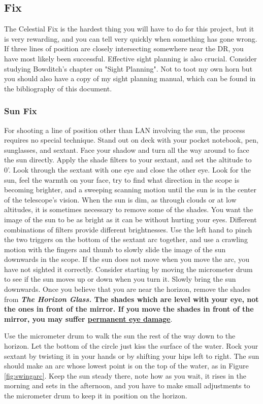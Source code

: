 \documentclass[letterpaper,12pt]{article}
\begin{document}
\subsection{Fix}
The Celestial Fix is the hardest thing you will have to do for this project, but it is very rewarding, and you can tell very quickly when something has gone wrong.
If three lines of position are closely intersecting somewhere near the DR, you have most likely been successful.
Effective sight planning is also crucial. Consider studying Bowditch's chapter on "Sight Planning".
Not to toot my own horn but you should also have a copy of my sight planning manual, which can be found in the bibliography of this document.

\subsubsection*{Sun Fix}
For shooting a line of position other than LAN involving the sun, the process requires no special technique.
Stand out on deck with your pocket notebook, pen, sunglasses, and sextant.
Face your shadow and turn all the way around to face the sun directly.
Apply the shade filters to your sextant, and set the altitude to 0'.
Look through the sextant with one eye and close the other eye.
Look for the sun, feel the warmth on your face, try to find what direction in the scope is becoming brighter, and a sweeping scanning motion until the sun is in the center of the telescope's vision.
When the sun is dim, as through clouds or at low altitudes, it is sometimes necessary to remove some of the shades.
You want the image of the sun to be as bright as it can be without hurting your eyes.
Different combinations of filters provide different brightnesses.
Use the left hand to pinch the two triggers on the bottom of the sextant arc together, and use a crawling motion with the fingers and thumb to slowly slide the image of the sun downwards in the scope.
If the sun does not move when you move the arc, you have not sighted it correctly.
Consider starting by moving the micrometer drum to see if the sun moves up or down when you turn it.
Slowly bring the sun downwards. Once you believe that you are near the horizon, remove the shades from \textbf{\emph{The Horizon Glass.}
The shades which are level with your eye, not the ones in front of the mirror.
If you move the shades in front of the mirror, you may suffer \underline{permanent eye damage}}.

Use the micrometer drum to walk the sun the rest of the way down to the horizon.
Let the bottom of the circle just kiss the surface of the water.
Rock your sextant by twisting it in your hands or by shifting your hips left to right.
The sun should make an arc whose lowest point is on the top of the water, as in Figure \ref{fig:swingarc}.
Keep the sun steady there, note how as you wait, it rises in the morning and sets in the afternoon, and you have to make small adjustments to the micrometer drum to keep it in position on the horizon.
\end{document}
